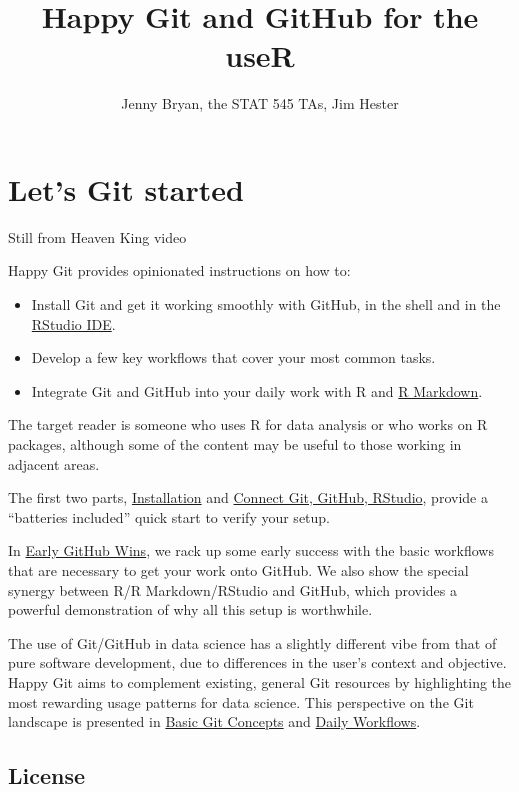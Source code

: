 \documentclass[
]{book}
\title{Happy Git and GitHub for the useR}
\author{Jenny Bryan, the STAT 545 TAs, Jim Hester}
\date{}
\providecommand{\tightlist}{%
  \setlength{\itemsep}{0pt}\setlength{\parskip}{0pt}}
\begin{document}
\maketitle

{
\setcounter{tocdepth}{1}
\tableofcontents
}
\chapter*{Let's Git started}\label{lets-git-started}

Still from Heaven King video

Happy Git provides opinionated instructions on how to:

\begin{itemize}
\tightlist
\item
  Install Git and get it working smoothly with GitHub, in the shell and in the \href{https://www.rstudio.com/products/rstudio/}{RStudio IDE}.
\item
  Develop a few key workflows that cover your most common tasks.
\item
  Integrate Git and GitHub into your daily work with R and \href{https://rmarkdown.rstudio.com}{R Markdown}.
\end{itemize}

The target reader is someone who uses R for data analysis or who works on R packages, although some of the content may be useful to those working in adjacent areas.

The first two parts, \hyperref[install-intro]{Installation} and \hyperref[connect-intro]{Connect Git, GitHub, RStudio}, provide a ``batteries included'' quick start to verify your setup.

In \hyperref[usage-intro]{Early GitHub Wins}, we rack up some early success with the basic workflows that are necessary to get your work onto GitHub. We also show the special synergy between R/R Markdown/RStudio and GitHub, which provides a powerful demonstration of why all this setup is worthwhile.

The use of Git/GitHub in data science has a slightly different vibe from that of pure software development, due to differences in the user's context and objective. Happy Git aims to complement existing, general Git resources by highlighting the most rewarding usage patterns for data science. This perspective on the Git landscape is presented in \hyperref[git-intro]{Basic Git Concepts} and \hyperref[workflows-intro]{Daily Workflows}.

\section*{License}\label{license}
\end{document}
